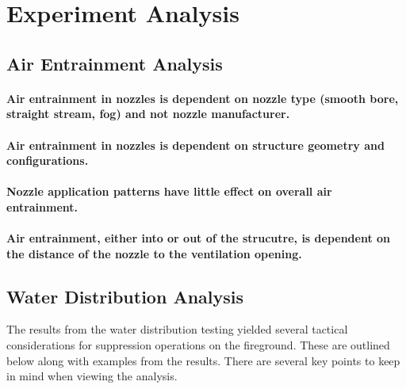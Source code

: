 \documentclass{article}
\begin{document}
\clearpage

\section{Experiment Analysis}

\subsection{Air Entrainment Analysis}

\vspace*{\baselineskip}
\paragraph{Air entrainment in nozzles is dependent on nozzle type (smooth bore, straight stream, fog) and not nozzle manufacturer.} \mbox{}



\paragraph{Air entrainment in nozzles is dependent on structure geometry and configurations.} \mbox{}



\paragraph{Nozzle application patterns have little effect on overall air entrainment.} \mbox{}



\paragraph{Air entrainment, either into or out of the strucutre, is dependent on the distance of the nozzle to the ventilation opening.} \mbox{}



\vspace*{\baselineskip}

\clearpage

\subsection{Water Distribution Analysis}

The results from the water distribution testing yielded several tactical considerations for suppression operations on the fireground. These are outlined below along with examples from the results. There are several key points to keep in mind when viewing the analysis. 
\end{document}

